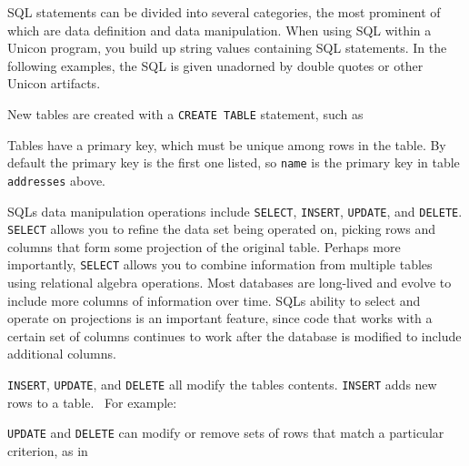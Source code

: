 SQL statements can be divided into several categories, the most
prominent of which are data definition and data manipulation. When
using SQL within a Unicon program, you build up string values
containing SQL statements. In the following examples, the SQL is given
unadorned by double quotes or other Unicon artifacts.

New tables are created with a \texttt{CREATE TABLE} statement, such as


Tables have a primary key, which must be unique among rows in the table.
By default the primary key is the first one listed, so \texttt{name} is
the primary key in table \texttt{addresses} above.

SQL{\textquotesingle}s data manipulation operations include
\texttt{SELECT}, \texttt{INSERT}, \texttt{UPDATE}, and \texttt{DELETE}.
\texttt{SELECT} allows you to refine the data set being operated on,
picking rows and columns that form some projection of the original
table. Perhaps more importantly, \texttt{SELECT} allows you to combine
information from multiple tables using relational algebra operations.
Most databases are long-lived and evolve to include more columns of
information over time. SQL{\textquotesingle}s ability to select and
operate on projections is an important feature, since code that works
with a certain set of columns continues to work after the database is
modified to include additional columns.

\texttt{INSERT}, \texttt{UPDATE}, and \texttt{DELETE} all modify the
table{\textquotesingle}s contents. \texttt{INSERT} adds new rows to a
table. \ For example:


\texttt{UPDATE} and \texttt{DELETE} can modify or remove sets of rows
that match a particular criterion, as in

